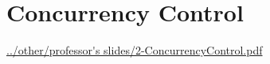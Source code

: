 \section{Concurrency Control}
\url{../other/professor's slides/2-ConcurrencyControl.pdf}\newline
\newline